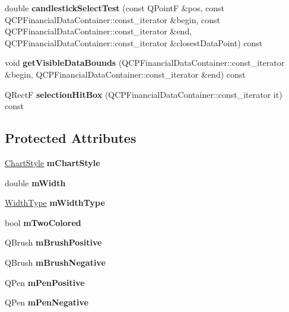 \begin{DoxyCompactItemize}
\mbox{\label{classQCPFinancial_a9783e91a33fd08a402b1a3821d43e471}} 
double {\bfseries candlestick\+Select\+Test} (const Q\+PointF \&pos, const Q\+C\+P\+Financial\+Data\+Container\+::const\+\_\+iterator \&begin, const Q\+C\+P\+Financial\+Data\+Container\+::const\+\_\+iterator \&end, Q\+C\+P\+Financial\+Data\+Container\+::const\+\_\+iterator \&closest\+Data\+Point) const
\item 
\mbox{\label{classQCPFinancial_a31a3dda8b6b9a5b674e28f1daeb21a75}} 
void {\bfseries get\+Visible\+Data\+Bounds} (Q\+C\+P\+Financial\+Data\+Container\+::const\+\_\+iterator \&begin, Q\+C\+P\+Financial\+Data\+Container\+::const\+\_\+iterator \&end) const
\item 
\mbox{\label{classQCPFinancial_afbe9e8cb0de3e9e789a9668b29cad098}} 
Q\+RectF {\bfseries selection\+Hit\+Box} (Q\+C\+P\+Financial\+Data\+Container\+::const\+\_\+iterator it) const
\end{DoxyCompactItemize}
\subsection*{Protected Attributes}
\begin{DoxyCompactItemize}
\item 
\mbox{\label{classQCPFinancial_ab65c2ce8d6354451870bb44b894c1e92}} 
\hyperlink{classQCPFinancial_a0f800e21ee98d646dfc6f8f89d10ebfb}{Chart\+Style} {\bfseries m\+Chart\+Style}
\item 
\mbox{\label{classQCPFinancial_af630e5eb8485146b9c777e63fd1cf993}} 
double {\bfseries m\+Width}
\item 
\mbox{\label{classQCPFinancial_a7926204997e04c9de9dbe1f092df125a}} 
\hyperlink{classQCPFinancial_aef1761dda71a53dc5269685e9e492626}{Width\+Type} {\bfseries m\+Width\+Type}
\item 
\mbox{\label{classQCPFinancial_a6afe919190b884d9bac026cefcc8c0a8}} 
bool {\bfseries m\+Two\+Colored}
\item 
\mbox{\label{classQCPFinancial_ab7e6eed16260a2f88ca6bd940dffea79}} 
Q\+Brush {\bfseries m\+Brush\+Positive}
\item 
\mbox{\label{classQCPFinancial_acb0e31874b7a1deb56bd42e8ab3e68f2}} 
Q\+Brush {\bfseries m\+Brush\+Negative}
\item 
\mbox{\label{classQCPFinancial_aa6599186f417ba615caebb3f6c762bd8}} 
Q\+Pen {\bfseries m\+Pen\+Positive}
\item 
\mbox{\label{classQCPFinancial_a263fbfefde2cc19c8d4024a8319c2bbb}} 
Q\+Pen {\bfseries m\+Pen\+Negative}
\end{DoxyCompactItemize}
